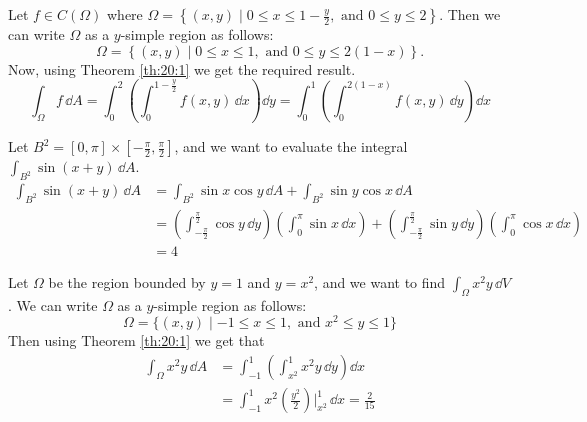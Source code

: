 \documentclass[../Analysis-3.tex]{subfiles}
\begin{document}
\begin{Eg}{}{}
  Let $f \in C(\Omega)$ where $\Omega = \left\{ (x,y) \mid 0 \leq x \leq 1 - \frac{y}{2}, \mbox{ and } 0 \leq y \leq 2 \right\}$. Then we can write $\Omega$ as a $y$-simple region as follows:
  \[
    \Omega = \left\{ (x,y) \mid 0 \leq x \leq 1, \mbox{ and } 0 \leq y \leq 2(1-x) \right\}.
  \]
  Now, using Theorem \ref{th:20:1} we get the required result.
  \[
    \int_{\Omega} f \, \dd A = \int_0^2 \left( \int_0^{1-\frac{y}{2}} f(x,y) \, \dd x\right) \dd y  =  \int_0^1 \left( \int_0^{2(1-x)} f(x,y) \, \dd y\right) \dd x
  \]
\end{Eg}

\begin{Eg}{}{}
  Let $B^2 = [0,\pi] \times [-\frac{\pi}{2}, \frac{\pi}{2}]$, and we want to evaluate the integral $\displaystyle\int_{B^2} \sin (x+y) \, \dd A$.
  \begin{align*}
    \int_{B^2}\sin(x+y) \, \dd A
     & = \int_{B^2} \sin x \cos y \, \dd A + \int_{B^2} \sin y \cos x \, \dd A \\
     & = \left( \int_{-\frac{\pi}{2}}^{\frac{\pi}{2}} \cos y \, \dd y\right)\left( \int_{0}^{\pi} \sin x \, \dd x\right) + \left( \int_{-\frac{\pi}{2}}^{\frac{\pi}{2}} \sin y \, \dd y\right)\left( \int_{0}^{\pi} \cos x \, \dd x\right) \\
     & = 4
  \end{align*}
\end{Eg}

\begin{Eg}{}{}
  Let $\Omega$ be the region bounded by $y = 1$ and $y = x^2$, and we want to find $\displaystyle\int_{\Omega} x^2y \, \dd V$. We can write $\Omega$ as a $y$-simple region as follows:
  \[
    \Omega = \{ (x,y) \mid -1 \leq x \leq 1, \mbox{ and } x^2 \leq y \leq 1 \}
  \]
  Then using Theorem \ref{th:20:1} we get that
  \begin{align*}
    \int_{\Omega} x^2y \, \dd A
     & = \int_{-1}^1 \left( \int_{x^2}^1 x^2y \, \dd y\right)\dd x               \\
     & = \int_{-1}^1 x^2 \left( \frac{y^2}{2} \right)\bigg\vert_{x^2}^1 \, \dd x = \frac{2}{15}
  \end{align*}
\end{Eg}
\end{document}
